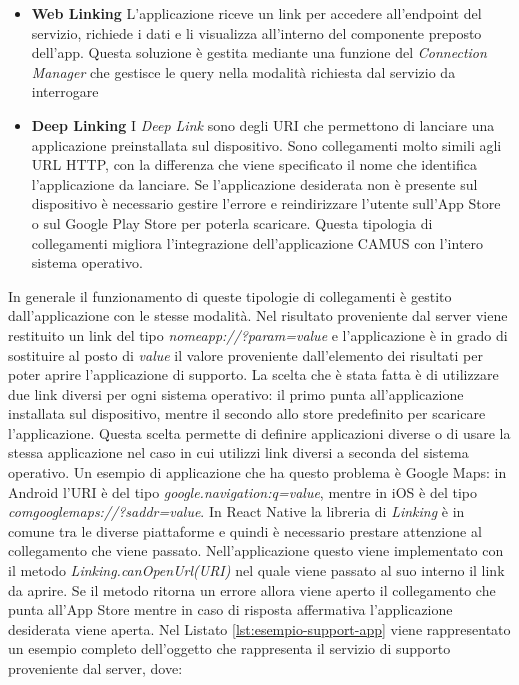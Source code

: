 \begin{itemize}
	\item \textbf{Web Linking}
	L'applicazione riceve un link per accedere all'endpoint del servizio, richiede i dati e li visualizza all'interno del componente preposto dell'app. Questa soluzione è gestita mediante una funzione del \emph{Connection Manager} che gestisce le query nella modalità richiesta dal servizio da interrogare
	\item \textbf{Deep Linking}
	I \emph{Deep Link} sono degli URI che permettono di lanciare una applicazione preinstallata sul dispositivo. Sono collegamenti molto simili agli URL HTTP, con la differenza che viene specificato il nome che identifica l'applicazione da lanciare. Se l'applicazione desiderata non è presente sul dispositivo è necessario gestire l'errore e reindirizzare l'utente sull'App Store o sul Google Play Store per poterla scaricare. Questa tipologia di collegamenti migliora l'integrazione dell'applicazione CAMUS con l'intero sistema operativo. 
\end{itemize}
	 
In generale il funzionamento di queste tipologie di collegamenti è gestito dall'ap\-pli\-ca\-zio\-ne con le stesse modalità. Nel risultato proveniente dal server viene restituito un link del tipo \emph{nomeapp://?param={value}} e l'applicazione è in grado di sostituire al posto di \emph{value} il valore proveniente dall'elemento dei risultati per poter aprire l'applicazione di supporto. La scelta che è stata fatta è di utilizzare due link diversi per ogni sistema operativo: il primo punta all'applicazione installata sul dispositivo, mentre il secondo allo store predefinito per scaricare l'applicazione. Questa scelta permette di definire applicazioni diverse o di usare la stessa applicazione nel caso in cui utilizzi link diversi a seconda del sistema operativo. Un esempio di applicazione che ha questo problema è Google Maps: in Android l'URI è del tipo \emph{google.navigation:q={value}}, mentre in iOS è del tipo \emph{comgooglemaps://?saddr={value}}. In React Native la libreria di \emph{Linking} è in comune tra le diverse piattaforme e quindi è necessario prestare attenzione al collegamento che viene passato. Nell'applicazione questo viene implementato con il metodo \emph{Linking.canOpenUrl(URI)} nel quale viene passato al suo interno il link da aprire. Se il metodo ritorna un errore allora viene aperto il collegamento che punta all'App Store mentre in caso di risposta affermativa l'applicazione desiderata viene aperta. Nel Listato \ref{lst:esempio-support-app} viene rappresentato un esempio completo dell'oggetto che rappresenta il servizio di supporto proveniente dal server, dove:

